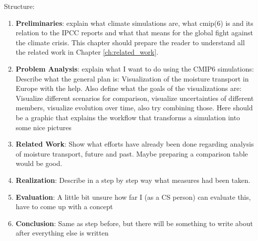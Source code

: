 Structure:

\begin{enumerate}
  \item \textbf{Preliminaries}: explain what climate simulations are, what cmip(6) is and its relation to the IPCC reports and what that means for the global fight against the climate crisis. 
    This chapter should prepare the reader to understand all the related work in Chapter \ref{ch:related_work}.
  \item \textbf{Problem Analysis}: explain what I want to do using the CMIP6 simulations: Describe what the general plan is: Visualization of the moisture transport in Europe with the help. 
    Also define what the goals of the visualizations are: Visualize different scenarios for comparison, visualize uncertainties of different members, visualize evolution over time, also try combining those. 
    Here should be a graphic that explains the workflow that transforms a simulation into some nice pictures
  \item \textbf{Related Work}: Show what efforts have already been done regarding analysis of moisture transport, future and past. 
    Maybe preparing a comparison table would be good. 
  \item \textbf{Realization}: Describe in a step by step way what measures had been taken. 
  \item \textbf{Evaluation}: A little bit unsure how far I (as a CS person) can evaluate this, have to come up with a concept
  \item \textbf{Conclusion}: Same as step before, but there will be something to write about after everything else is written
  
\end{enumerate}

